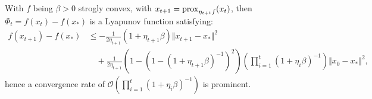 \documentclass[12pt]{article}
\begin{document}
        \begin{theorem}\label{ppm_lyapunov_scvx}
            With $f$ being $\beta > 0$ strogly convex, with $x_{t + 1} = \operatorname{prox}_{\eta_{t + 1}f}(x_t)$, then $\Phi_t = f(x_t) - f(x_*)$ is a Lyapunov function satisfying: 
            \begin{align*}
                f(x_{t + 1}) - f(x_*)
                &\le 
                -\frac{1}{2\eta_{t + 1}}(1 + \eta_{t + 1}\beta)\Vert x_{t + 1} - x_*\Vert^2
                \\
                & \quad 
                + \frac{1}{2\eta_{t + 1}}\left(
                    1 - (1 - (1 + \eta_{t + 1}\beta)^{-1})^2
                \right)
                \left(
                    \prod_{i = 1}^{t}
                        (1 + \eta_i \beta)^{-1}
                \right)\Vert x_0 - x_*\Vert^2, 
            \end{align*}
            hence a convergence rate of $\mathcal O\left(
                \prod_{i = 1}^{t}(1 + \eta_i \beta)^{-1}
            \right)$ is prominent. 
        \end{theorem}
\end{document}
